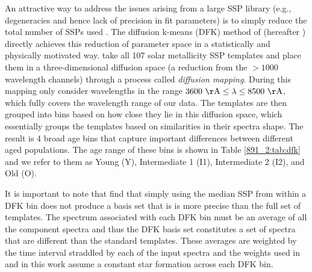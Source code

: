 An attractive way to address the issues arising from a large SSP
library (e.g., degeneracies and hence lack of precision in fit
parameters) is to simply reduce the total number of SSPs used
\citep[e.g.,][]{Tremonti04, CidFernandes05, Tojeiro07}.
The diffusion k-means (DFK) method of \citet{Mosby15} (hereafter
) directly achieves this reduction of parameter
space in a statistically and physically motivated
way.  take all 107 solar metallicity
 SSP templates and place them in a
three-dimensional diffusion space (a reduction from the $> 1000$
wavelength channels) through a process called \emph{diffusion
  mapping}. During this mapping  only consider
wavelengths in the range
$\val{3600}{\AA}\leq\lambda\leq\val{8500}{\AA}$, which fully covers
the wavelength range of our \GP data. The templates are then grouped
into bins based on how close they lie in this diffusion space, which
essentially groups the templates based on similarities in their
spectra shape. The result is 4 broad age bins that capture important
differences between different aged populations. The age range of these
bins is shown in Table \ref{891_2:tab:dfk} and we refer to them as Young
(Y), Intermediate 1 (I1), Intermediate 2 (I2), and Old (O).

It is important to note that  find that simply
using the median  SSP from within a DFK bin does
not produce a basis set that is is more precise than the full set of
 templates. The spectrum associated with each
DFK bin must be an average of all the component spectra and thus the
DFK basis set constitutes a set of spectra that are different than the
standard  templates. These averages are weighted
by the time interval straddled by each of the input
 spectra and the weights used in
 and in this work assume a constant star formation
across each DFK bin.

